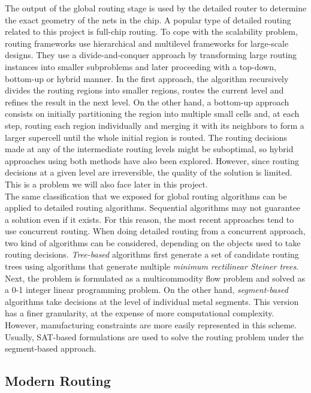 The output of the global routing stage is used by the detailed router to determine the exact geometry of the nets in the chip. A popular type of detailed routing related to this project is full-chip routing. To cope with the scalability problem, routing frameworks use hierarchical and multilevel frameworks for large-scale designs. They use a divide-and-conquer approach by transforming large routing instances into smaller subproblems and later proceeding with a top-down, bottom-up or hybrid manner. In the first approach, the algorithm recursively divides the routing regions into smaller regions, routes the current level and refines the result in the next level. On the other hand, a bottom-up approach consists on initially partitioning the region into multiple small cells and, at each step, routing each region individually and merging it with its neighbors to form a larger supercell until the whole initial region is routed. The routing decisions made at any of the intermediate routing levels might be suboptimal, so hybrid approaches using both methods have also been explored. However, since routing decisions at a given level are irreversible, the quality of the solution is limited. This is a problem we will also face later in this project. \\

The same classification that we exposed for global routing algorithms can be applied to detailed routing algorithms. Sequential algorithms may not guarantee a solution even if it exists. For this reason, the most recent approaches tend to use concurrent routing. When doing detailed routing from a concurrent approach, two kind of algorithms can be considered, depending on the objects used to take routing decisions. \textit{Tree-based} algorithms first generate a set of candidate routing trees using algorithms that generate multiple \textit{minimum rectilinear Steiner trees}. Next, the problem is formulated as a multicommodity flow problem and solved as a 0-1 integer linear programming problem. On the other hand, \textit{segment-based} algorithms take decisions at the level of individual metal segments. This version has a finer granularity, at the expense of more computational complexity. However, manufacturing constraints are more easily represented in this scheme. Usually, SAT-based formulations are used to solve the routing problem under the segment-based approach. 
  
  
\subsection{Modern Routing}

